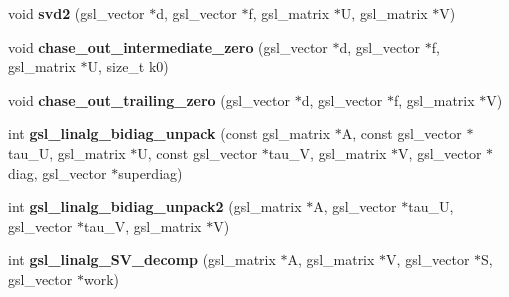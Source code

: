 \begin{CompactItemize}
\item 
void \textbf{svd2} (gsl\_\-vector $\ast$d, gsl\_\-vector $\ast$f, gsl\_\-matrix $\ast$U, gsl\_\-matrix $\ast$V)\label{group__nr_ge8a1bf5b51ec0f7ef1e067f01d466033}

\item 
void \textbf{chase\_\-out\_\-intermediate\_\-zero} (gsl\_\-vector $\ast$d, gsl\_\-vector $\ast$f, gsl\_\-matrix $\ast$U, size\_\-t k0)\label{group__nr_g1b67ba06b6b7daa4f73a163f404dd3d7}

\item 
void \textbf{chase\_\-out\_\-trailing\_\-zero} (gsl\_\-vector $\ast$d, gsl\_\-vector $\ast$f, gsl\_\-matrix $\ast$V)\label{group__nr_g15f37e448cf7eabd56ec2c351f148214}

\item 
int \textbf{gsl\_\-linalg\_\-bidiag\_\-unpack} (const gsl\_\-matrix $\ast$A, const gsl\_\-vector $\ast$tau\_\-U, gsl\_\-matrix $\ast$U, const gsl\_\-vector $\ast$tau\_\-V, gsl\_\-matrix $\ast$V, gsl\_\-vector $\ast$diag, gsl\_\-vector $\ast$superdiag)\label{group__nr_gc4843a336042d90bbacea983a80e29b9}

\item 
int \textbf{gsl\_\-linalg\_\-bidiag\_\-unpack2} (gsl\_\-matrix $\ast$A, gsl\_\-vector $\ast$tau\_\-U, gsl\_\-vector $\ast$tau\_\-V, gsl\_\-matrix $\ast$V)\label{group__nr_g4881575010a0877aba5efab6f368ab8c}

\item 
int \textbf{gsl\_\-linalg\_\-SV\_\-decomp} (gsl\_\-matrix $\ast$A, gsl\_\-matrix $\ast$V, gsl\_\-vector $\ast$S, gsl\_\-vector $\ast$work)\label{gsl__linalg_8c_1266bf489a94e8360f4e08d3cfdb0903}

\end{CompactItemize}

